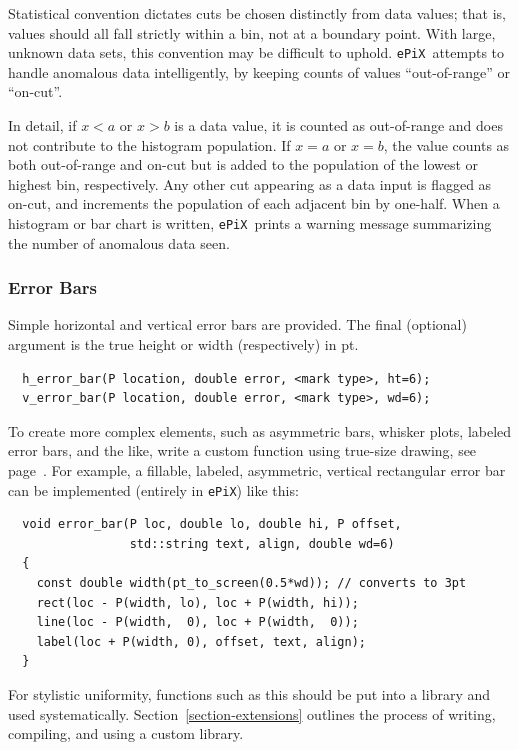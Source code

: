 \documentclass[12pt,letterpaper]{book}
\newcommand{\code}[1]{\texttt{#1}}
\newcommand{\ePiX}{\code{ePiX}}
\newcommand{\teximath}[1]{$#1$}
\newcommand{\findex}[1]{\ignorespaces}
\begin{document}
Statistical convention dictates cuts be chosen distinctly from data
values; that is, values should all fall strictly within a bin, not at
a boundary point. With large, unknown data sets, this convention may
be difficult to uphold. \ePiX\ attempts to handle anomalous data
intelligently, by keeping counts of values ``out-of-range'' or
``on-cut''.

In detail, if \teximath{x<a} or \teximath{x>b} is a data value, it is
counted as out-of-range and does not contribute to the histogram
population. If \teximath{x=a} or \teximath{x=b}, the value counts as
both out-of-range and on-cut but is added to the population of the
lowest or highest bin, respectively. Any other cut appearing as a data
input is flagged as on-cut, and increments the population of each
adjacent bin by one-half. When a histogram or bar chart is written,
\ePiX\ prints a warning message summarizing the number of anomalous
data seen.


\subsubsection*{Error Bars}

Simple horizontal and vertical error bars are provided.  The final
(optional) argument is the true height or width (respectively) in pt.
\findex{h\_error\_bar}
\findex{v\_error\_bar}
\begin{verbatim}
  h_error_bar(P location, double error, <mark type>, ht=6);
  v_error_bar(P location, double error, <mark type>, wd=6);
\end{verbatim}

To create more complex elements, such as asymmetric bars, whisker
plots, labeled error bars, and the like, write a custom function using
true-size drawing, see page~\pageref{truesize}. For example, a
fillable, labeled, asymmetric, vertical rectangular error bar can be
implemented (entirely in \ePiX) like this:
\begin{verbatim}
  void error_bar(P loc, double lo, double hi, P offset,
                 std::string text, align, double wd=6)
  {
    const double width(pt_to_screen(0.5*wd)); // converts to 3pt
    rect(loc - P(width, lo), loc + P(width, hi));
    line(loc - P(width,  0), loc + P(width,  0));
    label(loc + P(width, 0), offset, text, align);
  }
\end{verbatim}
For stylistic uniformity, functions such as this should be put into a
library and used systematically. Section~\ref{section-extensions}
outlines the process of writing, compiling, and using a custom
library.
\end{document}
